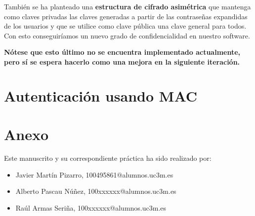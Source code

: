 \documentclass[a4paper,11pt]{article}
\begin{document}
También se ha planteado una \textbf{estructura de cifrado asimétrica} que mantenga como claves privadas las claves generadas a partir de las contraseñas expandidas de los usuarios y que se utilice como clave pública una clave general para todos. Con esto conseguiríamos un nuevo grado de confidencialidad en nuestro software. 

\textbf{Nótese que esto último no se encuentra implementado actualmente, pero sí se espera hacerlo como una mejora en la siguiente iteración.}

\section{Autenticación usando MAC}

\section{Anexo}
Este manuscrito y su correspondiente práctica ha sido realizado por:
\begin{itemize}
    \item Javier Martín Pizarro, 100495861@alumnos.uc3m.es
    \item Alberto Pascau Núñez, 100xxxxxx@alumnos.uc3m.es
    \item Raúl Armas Seriña, 100xxxxxx@alumnos.uc3m.es
\end{itemize}
\end{document}
